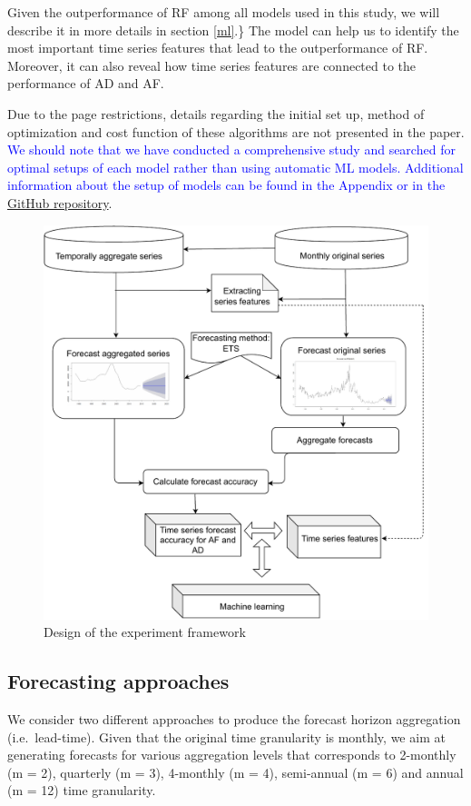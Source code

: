\documentclass[preprint, 3p,
authoryear]{elsarticle} %
\begin{document}
Given the outperformance of RF among all models used in this study, we
will describe it in more details in section \ref{ml}.\} The model can
help us to identify the most important time series features that lead to
the outperformance of RF. Moreover, it can also reveal how time series
features are connected to the performance of AD and AF.

Due to the page restrictions, details regarding the initial set up,
method of optimization and cost function of these algorithms are not
presented in the paper.
\textcolor{blue}{We should note that we have conducted a comprehensive study and searched for optimal setups of each model rather than using automatic ML models. Additional information about the setup of models can be found in the Appendix or in the}
\href{https://github.com/bahmanrostamitabar/time-searies-featute-temporal-aggregation}{GitHub
repository}.

\begin{figure}[H]

{\centering \includegraphics[width=0.7\linewidth]{img/300dpi/experiment_design} 

}

\caption{Design of the experiment framework}\label{fig:expdes}
\end{figure}

\hypertarget{forecasting-approaches}{%
\subsection{Forecasting approaches}\label{forecasting-approaches}}

We consider two different approaches to produce the forecast horizon
aggregation (i.e.~lead-time). Given that the original time granularity
is monthly, we aim at generating forecasts for various aggregation
levels that corresponds to 2-monthly (m = 2), quarterly (m = 3),
4-monthly (m = 4), semi-annual (m = 6) and annual (m = 12) time
granularity.
\end{document}
